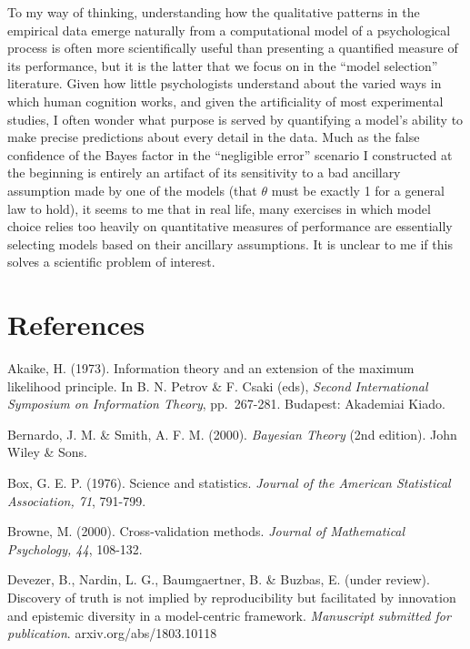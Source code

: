 \documentclass[doc]{apa6}
\theoremstyle{definition}
\theoremstyle{definition}
\theoremstyle{definition}
\theoremstyle{remark}
\begin{document}
To my way of thinking, understanding how the qualitative patterns in the
empirical data emerge naturally from a computational model of a
psychological process is often more scientifically useful than
presenting a quantified measure of its performance, but it is the latter
that we focus on in the \enquote{model selection} literature. Given how
little psychologists understand about the varied ways in which human
cognition works, and given the artificiality of most experimental
studies, I often wonder what purpose is served by quantifying a model's
ability to make precise predictions about every detail in the data. Much
as the false confidence of the Bayes factor in the \enquote{negligible
error} scenario I constructed at the beginning is entirely an artifact
of its sensitivity to a bad ancillary assumption made by one of the
models (that \(\theta\) must be exactly 1 for a general law to hold), it
seems to me that in real life, many exercises in which model choice
relies too heavily on quantitative measures of performance are
essentially selecting models based on their ancillary assumptions. It is
unclear to me if this solves a scientific problem of interest.

\section{References}\label{references}

\begingroup
\setlength{\parindent}{-0.5in} \setlength{\leftskip}{0.5in}

Akaike, H. (1973). Information theory and an extension of the maximum
likelihood principle. In B. N. Petrov \& F. Csaki (eds), \emph{Second
International Symposium on Information Theory}, pp.~267-281. Budapest:
Akademiai Kiado.

Bernardo, J. M. \& Smith, A. F. M. (2000). \emph{Bayesian Theory} (2nd
edition). John Wiley \& Sons.

Box, G. E. P. (1976). Science and statistics. \emph{Journal of the
American Statistical Association, 71}, 791-799.

Browne, M. (2000). Cross-validation methods. \emph{Journal of
Mathematical Psychology, 44}, 108-132.

Devezer, B., Nardin, L. G., Baumgaertner, B. \& Buzbas, E. (under
review). Discovery of truth is not implied by reproducibility but
facilitated by innovation and epistemic diversity in a model-centric
framework. \emph{Manuscript submitted for publication}.
arxiv.org/abs/1803.10118
\end{document}

